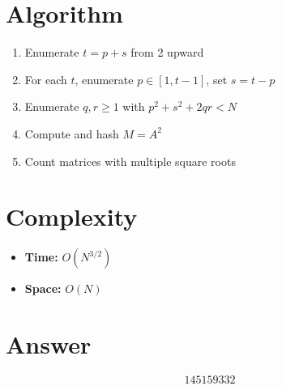 \documentclass[12pt]{article}
\begin{document}
\section{Algorithm}
\begin{enumerate}
    \item Enumerate $t = p + s$ from 2 upward
    \item For each $t$, enumerate $p \in [1, t-1]$, set $s = t - p$
    \item Enumerate $q, r \geq 1$ with $p^2 + s^2 + 2qr < N$
    \item Compute and hash $M = A^2$
    \item Count matrices with multiple square roots
\end{enumerate}

\section{Complexity}
\begin{itemize}
    \item \textbf{Time:} $O(N^{3/2})$
    \item \textbf{Space:} $O(N)$
\end{itemize}

\section{Answer}

\[
\boxed{145159332}
\]
\end{document}
